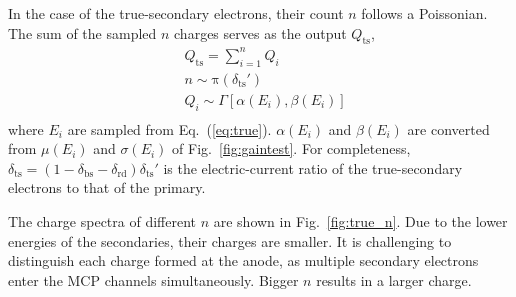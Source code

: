 In the case of the true-secondary electrons, their count $n$ follows a Poissonian. The sum of the sampled $n$ charges
serves as the output \(Q_{\mathrm{ts}}\),
\begin{equation}
	\label{eq:ts_all}
	\begin{aligned}
		 & Q_{\mathrm{ts}} = \sum_{i=1}^{n} Q_{i}            \\
		 & n \sim \mathrm{\pi}(\delta_{\mathrm{ts}}')        \\
		 & Q_{i} \sim \varGamma[\alpha(E_{i}), \beta(E_{i})] \\
	\end{aligned}
\end{equation}
where \(E_{i}\) are sampled from Eq.~(\ref{eq:true}).
$\alpha(E_{i})$ and $\beta(E_{i})$ are converted from
\(\mu(E_{i})\) and \(\sigma(E_{i})\) of Fig.~\ref{fig:gaintest}.
For completeness, \(\delta_\mathrm{ts} = (1-\delta_{\mathrm{bs}} - \delta_{\mathrm{rd}})\delta_{\mathrm{ts}}'\)
is the electric-current ratio of the true-secondary electrons to that of the primary.

The charge spectra of different $n$ are shown in Fig.~\ref{fig:true_n}.
Due to the lower energies of the secondaries, their charges are smaller.
It is challenging to distinguish each charge formed at the anode,
as multiple secondary electrons enter the MCP channels simultaneously.
Bigger $n$ results in a larger charge.

